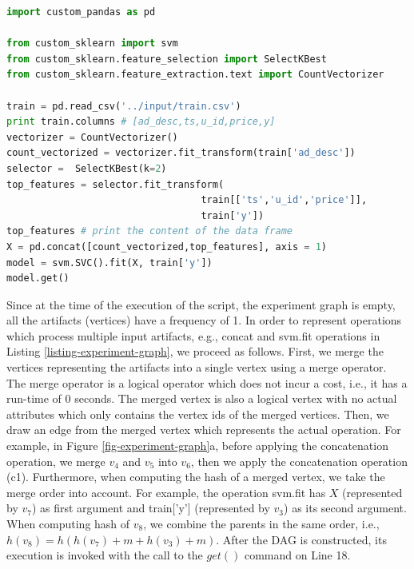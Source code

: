 \begin{lstlisting}[language=Python, caption=Example script,captionpos=b,label = {listing-experiment-graph}]
import custom_pandas as pd

from custom_sklearn import svm
from custom_sklearn.feature_selection import SelectKBest
from custom_sklearn.feature_extraction.text import CountVectorizer

train = pd.read_csv('../input/train.csv') 
print train.columns # [ad_desc,ts,u_id,price,y]
vectorizer = CountVectorizer()
count_vectorized = vectorizer.fit_transform(train['ad_desc'])
selector =  SelectKBest(k=2)
top_features = selector.fit_transform(
                                  train[['ts','u_id','price']],  
                                  train['y'])
top_features # print the content of the data frame			     
X = pd.concat([count_vectorized,top_features], axis = 1)
model = svm.SVC().fit(X, train['y'])
model.get()
\end{lstlisting}

Since at the time of the execution of the script, the experiment graph is empty, all the artifacts (vertices) have a frequency of 1.
In order to represent operations which process multiple input artifacts, e.g., concat and svm.fit operations in Listing \ref{listing-experiment-graph}, we proceed as follows.
First, we merge the vertices representing the artifacts into a single vertex using a merge operator.
The merge operator is a logical operator which does not incur a cost, i.e., it has a run-time of 0 seconds.
The merged vertex is also a logical vertex with no actual attributes which only contains the vertex ids of the merged vertices.
Then, we draw an edge from the merged vertex which represents the actual operation.
For example, in Figure \ref{fig-experiment-graph}a, before applying the concatenation operation, we merge $v_4$ and $v_5$ into $v_6$, then we apply the concatenation operation (c1).
Furthermore, when computing the hash of a merged vertex, we take the merge order into account.
For example, the operation svm.fit has $X$ (represented by $v_7$) as first argument and train['y'] (represented by $v_3$) as its second argument.
When computing hash of $v_8$, we combine the parents in the same order, i.e., $h(v_8) = h(h(v_7) + m + h(v_3) + m)$. 
After the DAG is constructed, its execution is invoked with the call to the $get()$ command on Line 18.

